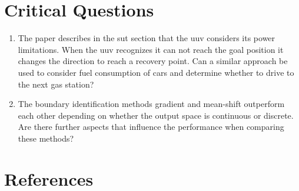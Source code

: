 \documentclass[oneside, notitlepage, twocolumn]{scrartcl}
\begin{document}
\section{Critical Questions}
\begin{enumerate}
    \item The paper describes in the \gls{sut} section that the \gls{uuv} considers its power limitations.
        When the \gls{uuv} recognizes it can not reach the goal position it changes the direction to reach a recovery point.
        Can a similar approach be used to consider fuel consumption of cars and determine whether to drive to the next gas station?
    \item The boundary identification methods gradient and mean-shift outperform each other depending on whether the output space is continuous or discrete.
        Are there further aspects that influence the performance when comparing these methods?
\end{enumerate}

\section{References}
\begingroup
\renewcommand{\section}[2]{}%
\nocite{*}
\printbibliography%
\endgroup
\end{document}

